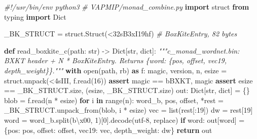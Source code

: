 \documentclass[
  10pt,
]{article}
\newenvironment{Shaded}{}{}
\newcommand{\BuiltInTok}[1]{\textcolor[rgb]{0.00,0.50,0.00}{#1}}
\newcommand{\CharTok}[1]{\textcolor[rgb]{0.25,0.44,0.63}{#1}}
\newcommand{\CommentTok}[1]{\textcolor[rgb]{0.38,0.63,0.69}{\textit{#1}}}
\newcommand{\ControlFlowTok}[1]{\textcolor[rgb]{0.00,0.44,0.13}{\textbf{#1}}}
\newcommand{\DecValTok}[1]{\textcolor[rgb]{0.25,0.63,0.44}{#1}}
\newcommand{\ImportTok}[1]{\textcolor[rgb]{0.00,0.50,0.00}{\textbf{#1}}}
\newcommand{\KeywordTok}[1]{\textcolor[rgb]{0.00,0.44,0.13}{\textbf{#1}}}
\newcommand{\NormalTok}[1]{#1}
\newcommand{\OperatorTok}[1]{\textcolor[rgb]{0.40,0.40,0.40}{#1}}
\newcommand{\StringTok}[1]{\textcolor[rgb]{0.25,0.44,0.63}{#1}}
\begin{document}
\begin{Shaded}
\begin{Highlighting}[]
\CommentTok{\#!/usr/bin/env python3}
\CommentTok{\# VAPMIP/monad\_combine.py}
\ImportTok{import}\NormalTok{ struct}
\ImportTok{from}\NormalTok{ typing }\ImportTok{import}\NormalTok{ Dict}

\NormalTok{\_BK\_STRUCT }\OperatorTok{=}\NormalTok{ struct.Struct(}\StringTok{\textquotesingle{}\textless{}32sB3xI19hf\textquotesingle{}}\NormalTok{)   }\CommentTok{\# BoxKiteEntry, 82 bytes}

\KeywordTok{def}\NormalTok{ read\_boxkite\_c(path: }\BuiltInTok{str}\NormalTok{) }\OperatorTok{{-}\textgreater{}}\NormalTok{ Dict[}\BuiltInTok{str}\NormalTok{, }\BuiltInTok{dict}\NormalTok{]:}
    \CommentTok{"""c\_monad\_wordnet.bin: BXKT header + N * BoxKiteEntry. Returns}
\CommentTok{    \{word: \{\textquotesingle{}pos\textquotesingle{}, \textquotesingle{}offset\textquotesingle{}, \textquotesingle{}vec19\textquotesingle{}, \textquotesingle{}depth\_weight\textquotesingle{}\}\}."""}
    \ControlFlowTok{with} \BuiltInTok{open}\NormalTok{(path, }\StringTok{\textquotesingle{}rb\textquotesingle{}}\NormalTok{) }\ImportTok{as}\NormalTok{ f:}
\NormalTok{        magic, version, n, esize }\OperatorTok{=}\NormalTok{ struct.unpack(}\StringTok{\textquotesingle{}\textless{}4sIII\textquotesingle{}}\NormalTok{, f.read(}\DecValTok{16}\NormalTok{))}
        \ControlFlowTok{assert}\NormalTok{ magic }\OperatorTok{==} \StringTok{b\textquotesingle{}BXKT\textquotesingle{}}\NormalTok{, magic}
        \ControlFlowTok{assert}\NormalTok{ esize }\OperatorTok{==}\NormalTok{ \_BK\_STRUCT.size, (esize, \_BK\_STRUCT.size)}
\NormalTok{        out: Dict[}\BuiltInTok{str}\NormalTok{, }\BuiltInTok{dict}\NormalTok{] }\OperatorTok{=}\NormalTok{ \{\}}
\NormalTok{        blob }\OperatorTok{=}\NormalTok{ f.read(n }\OperatorTok{*}\NormalTok{ esize)}
    \ControlFlowTok{for}\NormalTok{ i }\KeywordTok{in} \BuiltInTok{range}\NormalTok{(n):}
\NormalTok{        word\_b, pos, offset, }\OperatorTok{*}\NormalTok{rest }\OperatorTok{=}\NormalTok{ \_BK\_STRUCT.unpack\_from(blob, i }\OperatorTok{*}\NormalTok{ esize)}
\NormalTok{        vec }\OperatorTok{=} \BuiltInTok{list}\NormalTok{(rest[:}\DecValTok{19}\NormalTok{])}
\NormalTok{        dw }\OperatorTok{=}\NormalTok{ rest[}\DecValTok{19}\NormalTok{]}
\NormalTok{        word }\OperatorTok{=}\NormalTok{ word\_b.split(}\StringTok{b\textquotesingle{}}\CharTok{\textbackslash{}x00}\StringTok{\textquotesingle{}}\NormalTok{, }\DecValTok{1}\NormalTok{)[}\DecValTok{0}\NormalTok{].decode(}\StringTok{\textquotesingle{}utf{-}8\textquotesingle{}}\NormalTok{, }\StringTok{\textquotesingle{}replace\textquotesingle{}}\NormalTok{)}
        \ControlFlowTok{if}\NormalTok{ word:}
\NormalTok{            out[word] }\OperatorTok{=}\NormalTok{ \{}\StringTok{\textquotesingle{}pos\textquotesingle{}}\NormalTok{: pos, }\StringTok{\textquotesingle{}offset\textquotesingle{}}\NormalTok{: offset,}
                         \StringTok{\textquotesingle{}vec19\textquotesingle{}}\NormalTok{: vec, }\StringTok{\textquotesingle{}depth\_weight\textquotesingle{}}\NormalTok{: dw\}}
    \ControlFlowTok{return}\NormalTok{ out}
\end{Highlighting}
\end{Shaded}
\end{document}

